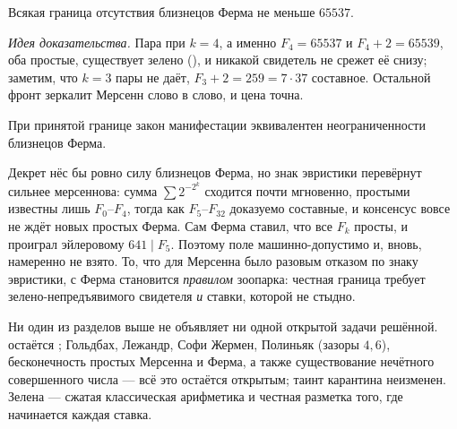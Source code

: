 \begin{theorem}\label{thm:fermatAbsenceBound_ge_65537}
\green{}\; Всякая граница отсутствия близнецов Ферма не меньше $65537$.
\end{theorem}

\emph{Идея доказательства.} Пара при $k=4$, а именно $F_4=65537$ и $F_4+2=65539$, оба простые,
существует зелено (), и никакой свидетель не срежет её снизу; заметим,
что $k=3$ пары не даёт, $F_3+2=259=7\cdot37$ составное. Остальной фронт зеркалит Мерсенн слово в
слово, и цена точна.

\begin{theorem}\label{thm:fermatManifestationLaw_iff_unbounded_of_boundary}
\green{}\; При принятой границе закон манифестации эквивалентен неограниченности близнецов Ферма.
\end{theorem}

Декрет нёс бы ровно силу близнецов Ферма, но знак эвристики перевёрнут сильнее мерсеннова: сумма
$\sum 2^{-2^k}$ сходится почти мгновенно, простыми известны лишь $F_0$--$F_4$, тогда как
$F_5$--$F_{32}$ доказуемо составные, и консенсус вовсе не ждёт новых простых Ферма. Сам Ферма ставил,
что все $F_k$ просты, и проиграл эйлеровому $641\mid F_5$. Поэтому поле 
машинно-допустимо и, вновь, намеренно не взято. То, что для Мерсенна было разовым отказом по знаку
эвристики, с Ферма становится \emph{правилом} зоопарка: честная граница требует зелено-непредъявимого
свидетеля \emph{и} ставки, которой не стыдно.

\begin{remark}
Ни один из разделов выше не объявляет ни одной открытой задачи решённой.
 остаётся ; Гольдбах, Лежандр, Софи Жермен, Полиньяк
(зазоры $4,6$), бесконечность простых Мерсенна и Ферма, а также существование нечётного совершенного
числа --- всё это остаётся \red{} открытым; таинт карантина неизменен. Зелена --- сжатая классическая
арифметика и честная разметка того, где начинается каждая ставка.
\end{remark}
